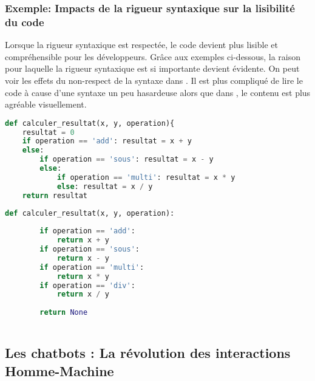 \documentclass{rapport}
\begin{document}
\subsubsection{Exemple: Impacts de la rigueur syntaxique sur la lisibilité du code}
Lorsque la rigueur syntaxique est respectée, le code devient plus lisible et compréhensible pour les développeurs. Grâce aux exemples ci-dessous, la raison pour laquelle la rigueur syntaxique est si importante devient évidente. On peut voir les effets du non-respect de la syntaxe dans . Il est plus compliqué de lire le code à cause d'une syntaxe un peu hasardeuse alors que dans , le contenu est plus agréable visuellement.\\
\begin{minipage}[t]{0.49\linewidth}
\label{lstlisting:WithoutSyntax}
\label{lstlisting:WithSyntax}
\begin{lstlisting}[language=python, style = code_style_no_border]
def calculer_resultat(x, y, operation){
    resultat = 0
    if operation == 'add': resultat = x + y
    else:
        if operation == 'sous': resultat = x - y
        else:
            if operation == 'multi': resultat = x * y
            else: resultat = x / y
    return resultat
\end{lstlisting}
\end{minipage}
\hfill\vrule\hfill
\begin{minipage}[t]{0.49\linewidth}
    \begin{lstlisting}[language=python, style = code_style_no_border]
    def calculer_resultat(x, y, operation):
        
        if operation == 'add':
            return x + y
        if operation == 'sous':
            return x - y
        if operation == 'multi':
            return x * y
        if operation == 'div':
            return x / y
        
        return None
    
    \end{lstlisting}
\end{minipage}

\newpage
\subsection{Les chatbots : La révolution des interactions Homme-Machine}
\end{document}
